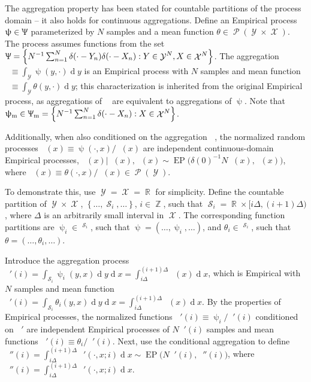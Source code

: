 \documentclass[12pt]{report}
\DeclareMathOperator{\drm}{\mathrm{d}}
\DeclareMathOperator{\Xcal}{\mathcal{X}}
\DeclareMathOperator{\Ycal}{\mathcal{Y}}
\DeclareMathOperator{\Scal}{\mathcal{S}}
\DeclareMathOperator{\Pcal}{\mathcal{P}}
\DeclareMathOperator{\Rbb}{\mathbb{R}}
\DeclareMathOperator{\Rbbgeq}{\mathbb{R}_{\geq 0}}
\DeclareMathOperator{\Zbb}{\mathbb{Z}}
\DeclareMathOperator{\EP}{\mathrm{EP}}
\DeclareMathOperator{\thetam}{\theta_\text{m}}
\DeclareMathOperator{\thetac}{\theta_\text{c}}
\DeclareMathOperator{\upthetac}{\uptheta_\text{c}}
\DeclareMathOperator{\uppsim}{\uppsi_\text{m}}
\DeclareMathOperator{\Uppsim}{\Uppsi_\text{m}}
\DeclareMathOperator{\uppsic}{\uppsi_\text{c}}
\begin{document}
The aggregation property has been stated for countable partitions of the process domain -- it also holds for continuous aggregations. Define an Empirical process $\uppsi \in \Uppsi$ parameterized by $N$ samples and a mean function $\theta \in \Pcal(\Ycal \times \Xcal)$. The process assumes functions from the set $\Uppsi = \left\{ N^{-1} \sum_{n=1}^N \delta(\cdot - Y_n) \delta(\cdot - X_n) : Y \in \Ycal^N, X \in \Xcal^N \right\}$. The aggregation $\uppsim \equiv \int_{\Ycal} \uppsi(y,\cdot) {\drm}y$ is an Empirical process with $N$ samples and mean function $\thetam \equiv \int_{\Ycal} \theta(y,\cdot) {\drm}y$; this characterization is inherited from the original Empirical process, as aggregations of $\uppsim$ are equivalent to aggregations of $\uppsi$. Note that $\uppsim \in \Uppsim = \left\{ N^{-1} \sum_{n=1}^N \delta(\cdot - X_n) : X \in \Xcal^N \right\}$.

Additionally, when also conditioned on the aggregation $\uppsim$, the normalized random processes $\uppsic(x) \equiv \uppsi(\cdot,x) / \uppsim(x)$ are independent continuous-domain Empirical processes, $\uppsic(x) | \uppsim(x), \upthetac(x) \sim \EP\big(\delta(0)^{-1} N \uppsim(x), \upthetac(x)\big)$, where $\thetac(x) \equiv \theta(\cdot,x) / \thetam(x) \in \Pcal(\Ycal)$.



To demonstrate this, use $\Ycal = \Xcal = \Rbb$ for simplicity. Define the countable partition of $\Ycal \times \Xcal$, $\left\{ \ldots,\Scal_i,\ldots \right\}$, $i \in \Zbb$, such that $\Scal_i = \Rbb \times \big [i\Delta,(i+1)\Delta \big)$, where $\Delta$ is an arbitrarily small interval in $\Xcal$. The corresponding function partitions are $\uppsi_i \in \Rbbgeq^{\Scal_i}$, such that $\uppsi = \left( \ldots,\uppsi_i,\ldots \right)$, and $\theta_i \in \Rbbgeq^{\Scal_i}$, such that $\theta = \left( \ldots,\theta_i,\ldots \right)$.

Introduce the aggregation process $\uppsim'(i) = \int_{\Scal_i} \uppsi_i(y,x) {\drm}y {\drm}x = \int_{i\Delta}^{(i+1)\Delta} \uppsim(x) {\drm}x$, which is Empirical with $N$ samples and mean function $\thetam'(i) = \int_{\Scal_i} \theta_i(y,x) {\drm}y {\drm}x = \int_{i\Delta}^{(i+1)\Delta} \thetam(x) {\drm}x$. By the properties of Empirical processes, the normalized functions $\uppsic'(i) \equiv \uppsi_i / \uppsim'(i)$ conditioned on $\uppsim'$ are independent Empirical processes of $N \uppsim'(i)$ samples and mean functions $\thetac'(i) \equiv \theta_i / \thetam'(i)$. Next, use the conditional aggregation to define $\uppsic''(i) = \int_{i\Delta}^{(i+1)\Delta} \uppsic'(\cdot,x;i) {\drm}x \sim \EP\big( N \uppsim'(i), \thetac''(i) \big)$, where $\thetac''(i) = \int_{i\Delta}^{(i+1)\Delta} \thetac'(\cdot,x;i) {\drm}x$. 
\end{document}
